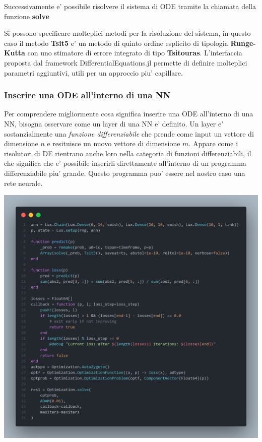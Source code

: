 Successivamente e' possibile risolvere il sistema di ODE tramite la chiamata
della funzione \textbf{solve}

Si possono specificare molteplici metodi per la risoluzione del sistema, in 
questo caso il metodo \textbf{Tsit5} \cite{10.1016/j.camwa.2011.06.002} e' un metodo 
di quinto ordine esplicito di tipologia \textbf{Runge-Kutta} con uno stimatore di errore
integrato di tipo \textbf{Tsitouras}. L'interfaccia proposta dal framework DifferentialEquations.jl 
permette di definire molteplici parametri aggiuntivi, utili per un approccio piu' capillare.

\subsubsection*{Inserire una ODE all'interno di una NN}
Per comprendere migliormente cosa significa inserire una ODE all'interno di una 
NN, bisogna osservare come un layer di una NN e' definito. Un layer e' sostanzialmente
una \emph{funzione differenziabile} che prende come input un vettore di dimensione $n$ 
e resituisce un nuovo vettore di dimensione $m$. Appare come i risolutori di DE rientrano 
anche loro nella categoria di funzioni differenziabili, il che significa che e' possibile
inserirli direttamente all'interno di un programma differenziabile piu' grande.
Questo programma puo' essere nel nostro caso una rete neurale. 

\begin{minipage}{\linewidth}
    \centering
    \includegraphics[width=\textwidth]{img/fann.png}
    \label{fig:NN_Julia_example}
\end{minipage}

